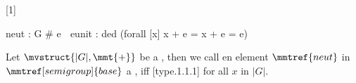 \begin{module}[id=semigroup,meta=http://kwarc.info/test?FOL]
\end{module}

\begin{module}[id=monoid,meta=http://kwarc.info/test?FOL]
[1]{\mixfixa[nobrackets]\rangle{,}}
\begin{MMT}[axioms]
  neut : G # e ^^1e
  eunit : ded (forall [x] x + e = x + e = e)^^1e
 \end{MMT}
 \begin{definition}
 Let $\mvstruct{|G|,\mmt{+} }$ be a , 
  then we call en element $\mmtref{neut}$ in $\mmtref[semigroup]{base}$ a
  , iff [type.1.1.1] for all $x$ in $|G|$. 
 \end{definition}  
\end{module}
